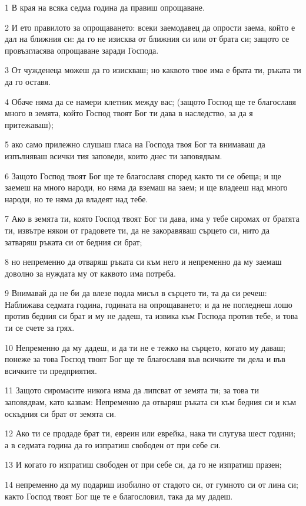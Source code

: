 \par 1 В края на всяка седма година да правиш опрощаване.
\par 2 И ето правилото за опрощаването: всеки заемодавец да опрости заема, който е дал на ближния си: да го не изисква от ближния си или от брата си; защото се провъзгласява опрощаване заради Господа.
\par 3 От чужденеца можеш да го изискваш; но каквото твое има е брата ти, ръката ти да го оставя.
\par 4 Обаче няма да се намери клетник между вас; (защото Господ ще те благославя много в земята, който Господ твоят Бог ти дава в наследство, за да я притежаваш);
\par 5 ако само прилежно слушаш гласа на Господа твоя Бог та внимаваш да изпълняваш всички тия заповеди, които днес ти заповядвам.
\par 6 Защото Господ твоят Бог ще те благославя според както ти се обеща; и ще заемеш на много народи, но няма да вземаш на заем; и ще владееш над много народи, но те няма да владеят над тебе.
\par 7 Ако в земята ти, която Господ твоят Бог ти дава, има у тебе сиромах от братята ти, извътре някои от градовете ти, да не закоравяваш сърцето си, нито да затваряш ръката си от бедния си брат;
\par 8 но непременно да отваряш ръката си към него и непременно да му заемаш доволно за нуждата му от каквото има потреба.
\par 9 Внимавай да не би да влезе подла мисъл в сърцето ти, та да си речеш: Наближава седмата година, годината на опрощаването; и да не погледнеш лошо против бедния си брат и му не дадеш, та извика към Господа против тебе, и това ти се счете за грях.
\par 10 Непременно да му дадеш, и да ти не е тежко на сърцето, когато му даваш; понеже за това Господ твоят Бог ще те благославя във всичките ти дела и във всичките ти предприятия.
\par 11 Защото сиромасите никога няма да липсват от земята ти; за това ти заповядвам, като казвам: Непременно да отваряш ръката си към бедния си и към оскъдния си брат от земята си.
\par 12 Ако ти се продаде брат ти, евреин или еврейка, нака ти слугува шест години; а в седмата година да го изпратиш свободен от при себе си.
\par 13 И когато го изпратиш свободен от при себе си, да го не изпратиш празен;
\par 14 непременно да му подариш изобилно от стадото си, от гумното си от лина си; както Господ твоят Бог ще те е благословил, така да му дадеш.
